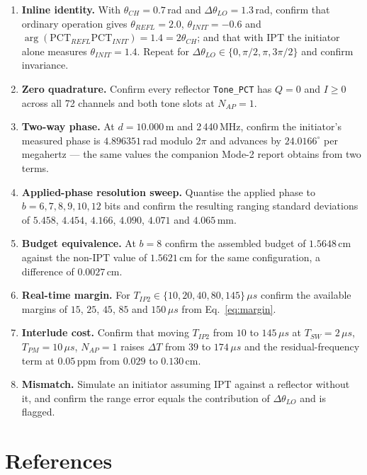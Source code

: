 \documentclass[11pt,a4paper]{article}
\newcommand{\us}{\,\ensuremath{\upmu}s}
\newcommand{\PCT}{\ensuremath{\mathrm{PCT}}}
\newcommand{\IPT}{\ensuremath{\mathrm{IPT}}}
\newcommand{\Tsw}{T_{SW}}
\newcommand{\Tpm}{T_{PM}}
\newcommand{\Tiptwo}{T_{IP2}}
\newcommand{\Nap}{N_{AP}}
\newcommand{\code}[1]{\texttt{\small #1}}
\providecommand{\upmu}{\mu}
\begin{document}
\begin{enumerate}[label=\textbf{E\arabic*.},leftmargin=2.6em,itemsep=2pt]
  \item \textbf{Inline identity.} With $\theta_{CH} = 0.7$\,rad and $\Delta\theta_{LO} = 1.3$\,rad,
    confirm that ordinary operation gives $\theta_{REFL} = 2.0$, $\theta_{INIT} = -0.6$ and
    $\arg(\PCT_{REFL}\PCT_{INIT}) = 1.4 = 2\theta_{CH}$; and that with \IPT{} the initiator alone
    measures $\theta_{INIT} = 1.4$. Repeat for $\Delta\theta_{LO} \in \{0, \pi/2, \pi, 3\pi/2\}$ and
    confirm invariance.
  \item \textbf{Zero quadrature.} Confirm every reflector \code{Tone\_PCT} has $Q = 0$ and
    $I \ge 0$ across all 72 channels and both tone slots at $\Nap = 1$.
  \item \textbf{Two-way phase.} At $d = 10.000$\,m and 2\,440\,MHz, confirm the initiator's measured
    phase is $4.896351$\,rad modulo $2\pi$ and advances by $24.0166^{\circ}$ per megahertz --- the
    same values the companion Mode-2 report obtains from two terms.
  \item \textbf{Applied-phase resolution sweep.} Quantise the applied phase to $b = 6,7,8,9,10,12$
    bits and confirm the resulting ranging standard deviations of $5.458$, $4.454$, $4.166$,
    $4.090$, $4.071$ and $4.065$\,mm.
  \item \textbf{Budget equivalence.} At $b = 8$ confirm the assembled budget of $1.5648$\,cm against
    the non-\IPT{} value of $1.5621$\,cm for the same configuration, a difference of $0.0027$\,cm.
  \item \textbf{Real-time margin.} For $\Tiptwo \in \{10,20,40,80,145\}\us$ confirm the available
    margins of $15$, $25$, $45$, $85$ and $150\us$ from Eq.~\eqref{eq:margin}.
  \item \textbf{Interlude cost.} Confirm that moving $\Tiptwo$ from $10$ to $145\us$ at
    $\Tsw = 2\us$, $\Tpm = 10\us$, $\Nap = 1$ raises $\Delta T$ from $39$ to $174\us$ and the
    residual-frequency term at $0.05$\,ppm from $0.029$ to $0.130$\,cm.
  \item \textbf{Mismatch.} Simulate an initiator assuming \IPT{} against a reflector without it, and
    confirm the range error equals the contribution of $\Delta\theta_{LO}$ and is flagged.
\end{enumerate}

\clearpage
\section*{References}
\end{document}
